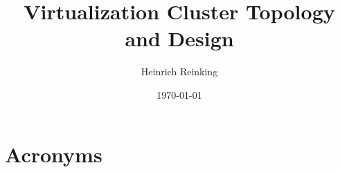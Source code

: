 \documentclass[PMO,authoryear,toc]{lsstdoc}
\title{Virtualization Cluster Topology and Design}
\author{%
Heinrich Reinking
}
\date {\today}
\begin{document}
\maketitle



\appendix
\renewcommand{\refname}{} %


\section{Acronyms} \label{sec:acronyms}
\newpage

\end{document}

